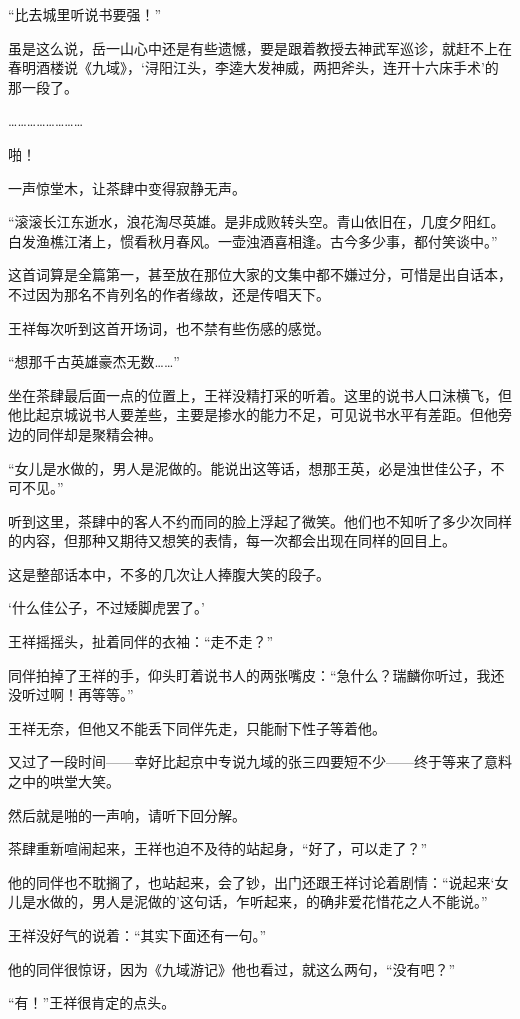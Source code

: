 “比去城里听说书要强！”

虽是这么说，岳一山心中还是有些遗憾，要是跟着教授去神武军巡诊，就赶不上在春明酒楼说《九域》，‘浔阳江头，李逵大发神威，两把斧头，连开十六床手术’的那一段了。

……………………

啪！

一声惊堂木，让茶肆中变得寂静无声。

“滚滚长江东逝水，浪花淘尽英雄。是非成败转头空。青山依旧在，几度夕阳红。白发渔樵江渚上，惯看秋月春风。一壶浊酒喜相逢。古今多少事，都付笑谈中。”

这首词算是全篇第一，甚至放在那位大家的文集中都不嫌过分，可惜是出自话本，不过因为那名不肯列名的作者缘故，还是传唱天下。

王祥每次听到这首开场词，也不禁有些伤感的感觉。

“想那千古英雄豪杰无数……”

坐在茶肆最后面一点的位置上，王祥没精打采的听着。这里的说书人口沫横飞，但他比起京城说书人要差些，主要是掺水的能力不足，可见说书水平有差距。但他旁边的同伴却是聚精会神。

“女儿是水做的，男人是泥做的。能说出这等话，想那王英，必是浊世佳公子，不可不见。”

听到这里，茶肆中的客人不约而同的脸上浮起了微笑。他们也不知听了多少次同样的内容，但那种又期待又想笑的表情，每一次都会出现在同样的回目上。

这是整部话本中，不多的几次让人捧腹大笑的段子。

‘什么佳公子，不过矮脚虎罢了。’

王祥摇摇头，扯着同伴的衣袖：“走不走？”

同伴拍掉了王祥的手，仰头盯着说书人的两张嘴皮：“急什么？瑞麟你听过，我还没听过啊！再等等。”

王祥无奈，但他又不能丢下同伴先走，只能耐下性子等着他。

又过了一段时间——幸好比起京中专说九域的张三四要短不少——终于等来了意料之中的哄堂大笑。

然后就是啪的一声响，请听下回分解。

茶肆重新喧闹起来，王祥也迫不及待的站起身，“好了，可以走了？”

他的同伴也不耽搁了，也站起来，会了钞，出门还跟王祥讨论着剧情：“说起来‘女儿是水做的，男人是泥做的’这句话，乍听起来，的确非爱花惜花之人不能说。”

王祥没好气的说着：“其实下面还有一句。”

他的同伴很惊讶，因为《九域游记》他也看过，就这么两句，“没有吧？”

“有！”王祥很肯定的点头。

